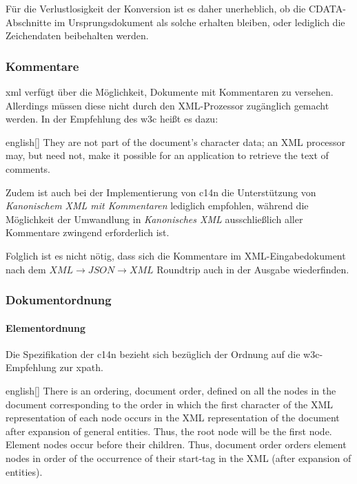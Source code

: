 Für die Verlustlosigkeit der Konversion ist es daher unerheblich, ob die CDATA-Abschnitte im Ursprungsdokument als solche erhalten bleiben, oder lediglich die Zeichendaten beibehalten werden.

\subsubsection{Kommentare}

\acrshort{xml} verfügt über die Möglichkeit, Dokumente mit Kommentaren zu versehen. Allerdings müssen diese nicht durch den XML-Prozessor zugänglich gemacht werden. In der Empfehlung des \gls{w3c} heißt es dazu:

\begin{foreigndisplayquote}{english}[{\cite[Abschnitt~2.5]{maler2008xml}}]
They are not part of the document's character data; an XML processor may, but need not, make it possible for an application to retrieve the text of comments.
\end{foreigndisplayquote}

Zudem ist auch bei der Implementierung von \acrlong{c14n} die Unterstützung von \emph{Kanonischem XML mit Kommentaren} lediglich empfohlen, während die Möglichkeit der Umwandlung in \emph{Kanonisches XML} ausschließlich aller Kommentare zwingend erforderlich ist.\cite[Abschnitt~2.1]{boyer2001c14n}

Folglich ist es nicht nötig, dass sich die Kommentare im XML-Eingabedokument nach dem $XML\rightarrow{}JSON\rightarrow{}XML$ Roundtrip auch in der Ausgabe wiederfinden.

\subsubsection{Dokumentordnung}

\paragraph{Elementordnung}

Die Spezifikation der \acrshort{c14n} bezieht sich bezüglich der Ordnung auf die \acrshort{w3c}-Empfehlung zur \acrfull{xpath}\cite[Abschnitt~2.2]{boyer2001c14n}.

\begin{foreigndisplayquote}{english}[{\cite[Abschnitt~5]{clark1999xpath1}}]
There is an ordering, document order, defined on all the nodes in the document corresponding to the order in which the first character of the XML representation of each node occurs in the XML representation of the document after expansion of general entities. Thus, the root node will be the first node. Element nodes occur before their children. Thus, document order orders element nodes in order of the occurrence of their start-tag in the XML (after expansion of entities).
\end{foreigndisplayquote}

